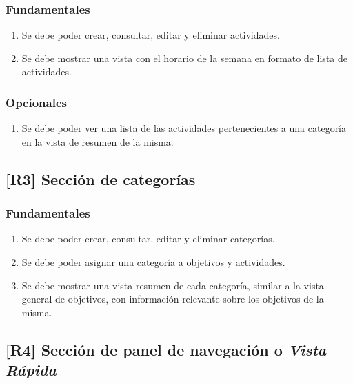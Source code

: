 \documentclass[10pt, a4paper]{aqademic}
\begin{document}
\subsubsection*{Fundamentales}

\begin{enumerate}[label=\textbf{R2.\arabic*f}, leftmargin=10mm]
	\item Se debe poder crear, consultar, editar y eliminar actividades.
	
	\item Se debe mostrar una vista con el horario de la semana en formato de lista de actividades.
\end{enumerate}

\subsubsection*{Opcionales}

\begin{enumerate}[label=\textbf{R2.\arabic*o}, leftmargin=10mm]
	\item Se debe poder ver una lista de las actividades pertenecientes a una categoría en la vista de resumen de la misma.
\end{enumerate}


\subsection*{[R3] Sección de categorías}

\subsubsection*{Fundamentales}

\begin{enumerate}[label=\textbf{R3.\arabic*f}, leftmargin=10mm]
	\item Se debe poder crear, consultar, editar y eliminar categorías.
	
	\item Se debe poder asignar una categoría a objetivos y actividades.
	
	\item Se debe mostrar una vista resumen de cada categoría, similar a la vista general de objetivos, con información relevante sobre los objetivos de la misma.
\end{enumerate}


\subsection*{[R4] Sección de panel de navegación o \textit{Vista Rápida}}
\end{document}
